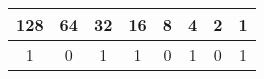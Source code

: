 \documentclass{report}
\begin{document}
\begin{table}[h]
\centering
\begin{tabular}{|c|c|c|c|c|c|c|c|}
\hline
\cellcolor[gray]{0.8}128&64&32&16&8&4&2&1\\\hline
1&0&1&1&0&1&0&1\\\hline
\end{tabular}
\end{table}
\end{document}
